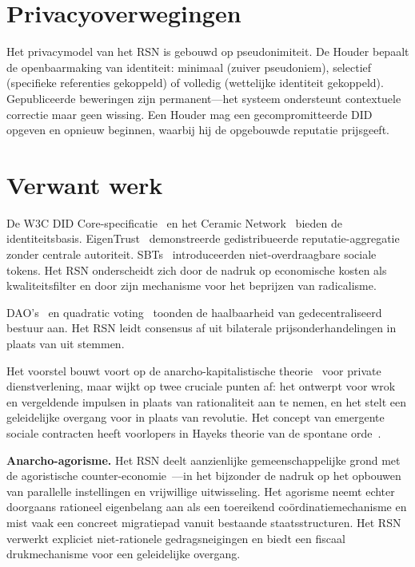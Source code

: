 \documentclass[11pt,a4paper,twocolumn]{article}
\begin{document}
\section{Privacyoverwegingen}

Het privacymodel van het RSN is gebouwd op pseudonimiteit. De Houder bepaalt de openbaarmaking van identiteit: minimaal (zuiver pseudoniem), selectief (specifieke referenties gekoppeld) of volledig (wettelijke identiteit gekoppeld). Gepubliceerde beweringen zijn permanent---het systeem ondersteunt contextuele correctie maar geen wissing. Een Houder mag een gecompromitteerde DID opgeven en opnieuw beginnen, waarbij hij de opgebouwde reputatie prijsgeeft.

\section{Verwant werk}

De W3C DID Core-specificatie~\cite{did2022} en het Ceramic Network~\cite{ceramic2023} bieden de identiteitsbasis. EigenTrust~\cite{kamvar2003} demonstreerde gedistribueerde reputatie-aggregatie zonder centrale autoriteit. SBTs~\cite{weyl2022} introduceerden niet-overdraagbare sociale tokens. Het RSN onderscheidt zich door de nadruk op economische kosten als kwaliteitsfilter en door zijn mechanisme voor het beprijzen van radicalisme.

DAO's~\cite{buterin2014} en quadratic voting~\cite{buterin2019} toonden de haalbaarheid van gedecentraliseerd bestuur aan. Het RSN leidt consensus af uit bilaterale prijsonderhandelingen in plaats van uit stemmen.

Het voorstel bouwt voort op de anarcho-kapitalistische theorie~\cite{rothbard1973,hoppe2001} voor private dienstverlening, maar wijkt op twee cruciale punten af: het ontwerpt voor wrok en vergeldende impulsen in plaats van rationaliteit aan te nemen, en het stelt een geleidelijke overgang voor in plaats van revolutie. Het concept van emergente sociale contracten heeft voorlopers in Hayeks theorie van de spontane orde~\cite{hayek1973}.

\textbf{Anarcho-agorisme.} Het RSN deelt aanzienlijke gemeenschappelijke grond met de agoristische counter-economie~\cite{konkin2006}---in het bijzonder de nadruk op het opbouwen van parallelle instellingen en vrijwillige uitwisseling. Het agorisme neemt echter doorgaans rationeel eigenbelang aan als een toereikend coördinatiemechanisme en mist vaak een concreet migratiepad vanuit bestaande staatsstructuren. Het RSN verwerkt expliciet niet-rationele gedragsneigingen en biedt een fiscaal drukmechanisme voor een geleidelijke overgang.
\end{document}
